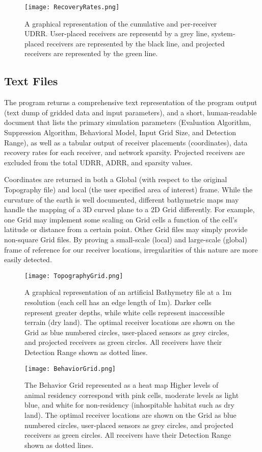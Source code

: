\begin{figure}[ht]
	\texttt{[image: RecoveryRates.png]}
	\caption{\label{recoveryGraph} A graphical representation of the cumulative and per-receiver UDRR.  User-placed receivers are representd by a grey line, system-placed receivers are represented by the black line, and projected receivers are represented by the green line.} 
\end{figure}

\subsection{Text Files}
The program returns a comprehensive text representation of the program output (text dump of gridded data and input parameters), and a short, human-readable document that lists the primary simulation parameters (Evaluation Algorithm, Suppression Algorithm, Behavioral Model, Input Grid Size, and Detection Range), as well as a tabular output of receiver placements (coordinates), data recovery rates for each receiver, and network sparsity.  Projected receivers are excluded from the total UDRR, ADRR, and sparsity values.

Coordinates are returned in both a Global (with respect to the original Topography file) and local (the user specified area of interest) frame.  While the curvature of the earth is well documented, different bathymetric maps may handle the mapping of a 3D curved plane to a 2D Grid differently.  For example, one Grid may implement some scaling on Grid cells a function of the cell's latitude or distance from a certain point.  Other Grid files may simply provide non-square Grid files.  By proving a small-scale (local) and large-scale (global) frame of reference for our receiver locations, irregularities of this nature are more easily detected.

\begin{figure}[ht]
	\texttt{[image: TopographyGrid.png]}
	\caption{A graphical representation of an artificial Bathymetry file at a 1m resolution (each cell has an edge length of 1m).  Darker cells represent greater depths, while white cells represent inaccessible terrain (dry land).  The optimal receiver locations are shown on the Grid as blue numbered circles, user-placed sensors as grey circles, and projected receivers as green circles.  All receivers have their Detection Range shown as dotted lines.\label{bathyGraph}}
\end{figure}

\begin{figure}[ht]
	\texttt{[image: BehaviorGrid.png]}
	\caption{The Behavior Grid represented as a heat map  Higher levels of animal residency correspond with pink cells, moderate levels as light blue, and white for non-residency (inhospitable habitat such as  dry land).  The optimal receiver locations are shown on the Grid as blue numbered circles, user-placed sensors as grey circles, and projected receivers as green circles.  All receivers have their Detection Range shown as dotted lines.\label{animalGraph}}
\end{figure}


